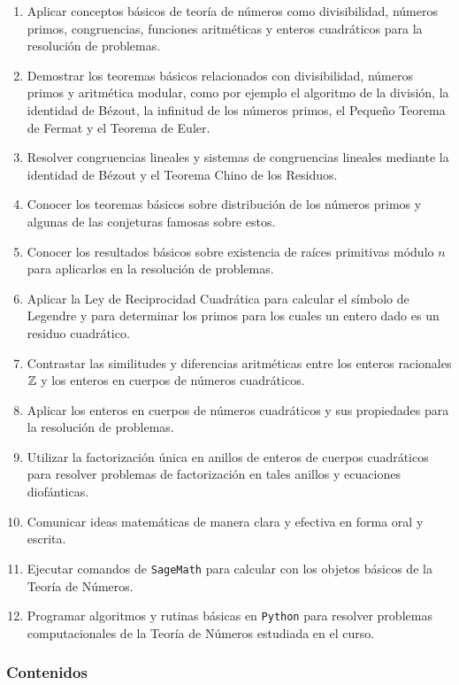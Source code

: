 \begin{refsection}
\begin{enumerate}
\item Aplicar conceptos básicos de teoría de números como divisibilidad, números primos, congruencias, funciones aritméticas y enteros cuadráticos para la resolución de problemas.
\item Demostrar los teoremas básicos relacionados con divisibilidad, números primos y aritmética modular, como por ejemplo el algoritmo de la división, la identidad de Bézout, la infinitud de los números primos, el Pequeño Teorema de Fermat y el Teorema de Euler.
\item Resolver congruencias lineales y sistemas de congruencias lineales mediante la identidad de Bézout y el Teorema Chino de los Residuos.
\item Conocer los teoremas básicos sobre distribución de los números primos y algunas de las conjeturas famosas sobre estos.
\item Conocer los resultados básicos sobre existencia de raíces primitivas módulo $n$ para aplicarlos en la resolución de problemas.
\item Aplicar la Ley de Reciprocidad Cuadrática para calcular el símbolo de Legendre y para determinar los primos para los cuales un entero dado es un residuo cuadrático.
\item Contrastar las similitudes y diferencias aritméticas entre los enteros racionales $\mathbb{Z}$ y los enteros en cuerpos de números cuadráticos.
\item Aplicar los enteros en cuerpos de números cuadráticos y sus propiedades para la resolución de problemas.
\item Utilizar la factorización única en anillos de enteros de cuerpos cuadráticos para resolver problemas de factorización en tales anillos y ecuaciones diofánticas.
\item Comunicar ideas matemáticas de manera clara y efectiva en forma oral y escrita.
\item Ejecutar comandos de \texttt{SageMath} para calcular con los objetos básicos de la Teoría de Números.
\item Programar algoritmos y rutinas básicas en \texttt{Python} para resolver problemas computacionales de la Teoría de Números estudiada en el curso.
\end{enumerate}

\subsubsection*{Contenidos}


\end{refsection}
